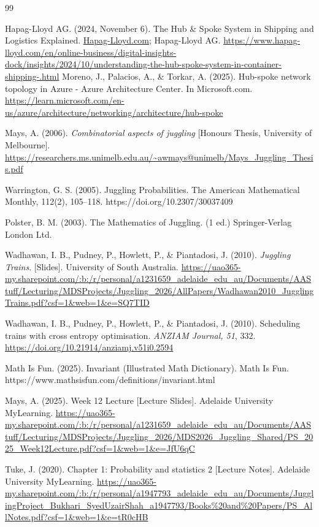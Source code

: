 \documentclass{article}
\theoremstyle{definition}
\theoremstyle{remark}
\numberwithin{equation}{section}
\begin{document}
\begin{thebibliography}{99}

Hapag-Lloyd AG. (2024, November 6). The Hub \& Spoke System in Shipping and Logistics Explained. \url{Hapag-Lloyd.com}; Hapag-Lloyd AG. \url{https://www.hapag-lloyd.com/en/online-business/digital-insights-dock/insights/2024/10/understanding-the-hub-spoke-system-in-container-shipping-.html}
Moreno, J., Palacios, A., \& Torkar, A. (2025). Hub-spoke network topology in Azure - Azure Architecture Center. In {Microsoft.com}. \url{https://learn.microsoft.com/en-us/azure/architecture/networking/architecture/hub-spoke}

 Mays, A. (2006). \textit{Combinatorial aspects of juggling} [Honours Thesis, University of Melbourne]. \url{https://researchers.ms.unimelb.edu.au/~awmays@unimelb/Mays\_Juggling\_Thesis.pdf}

Warrington, G. S. (2005). Juggling Probabilities. The American Mathematical Monthly, 112(2), 105–118. https://doi.org/10.2307/30037409

Polster, B. M. (2003). The Mathematics of Juggling. (1 ed.) Springer-Verlag London Ltd.

Wadhawan, I. B., Pudney, P., Howlett, P., \& Piantadosi, J. (2010). \textit{Juggling Trains}. [Slides]. University of South Australia. \url{https://uao365-my.sharepoint.com/:b:/r/personal/a1231659_adelaide_edu_au/Documents/AAStuff/Lecturing/MDSProjects/Juggling_2026/AllPapers/Wadhawan2010_JugglingTrains.pdf?csf=1&web=1&e=SQ7TID}

Wadhawan, I. B., Pudney, P., Howlett, P., \& Piantadosi, J. (2010). Scheduling trains with cross entropy optimisation. \textit{ANZIAM Journal, 51}, 332. \url{https://doi.org/10.21914/anziamj.v51i0.2594}

Math Is Fun. (2025). Invariant (Illustrated Math Dictionary). Math Is Fun. https://www.mathsisfun.com/definitions/invariant.html

Mays, A. (2025). Week 12 Lecture [Lecture Slides]. Adelaide University MyLearning. \url{https://uao365-my.sharepoint.com/:b:/r/personal/a1231659\_adelaide\_edu_au/Documents/AAStuff/Lecturing/MDSProjects/Juggling\_2026/MDS2026\_Juggling\_Shared/PS\_2025\_Week12Lecture.pdf?csf=1&web=1&e=JfU6qC}

Tuke, J. (2020). Chapter 1: Probability and statistics 2 [Lecture Notes]. Adelaide University MyLearning. \url{https://uao365-my.sharepoint.com/:b:/r/personal/a1947793_adelaide_edu_au/Documents/JugglingProject_Bukhari_SyedUzairShah_a1947793/Books%20and%20Papers/PS_AllNotes.pdf?csf=1&web=1&e=tR0cHB} 


\end{thebibliography}
\end{document}
